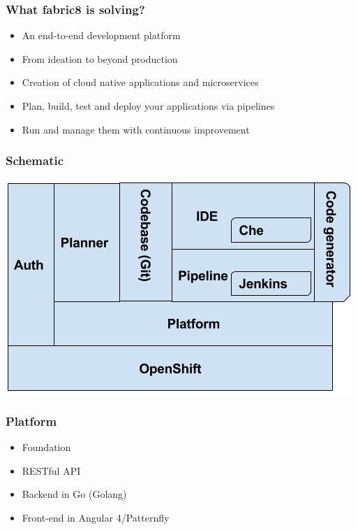 \documentclass[aspectratio=169]{beamer}
\begin{document}
\begin{frame}
  \frametitle{What fabric8 is solving?}

  \begin{itemize}

  \item<1-> An end-to-end development platform

  \item<2-> From ideation to beyond production

  \item<3-> Creation of cloud native applications and  microservices

  \item<4-> Plan, build, test and deploy your applications via pipelines

  \item<5-> Run and manage them with continuous improvement

  \end{itemize}

\end{frame}

\begin{frame}
  \frametitle{Schematic}
  \includegraphics[scale=.65]{images/schematic.png}
\end{frame}

\begin{frame}
  \frametitle{Platform}

  \begin{itemize}
  \item<1-> Foundation
  \item<2-> RESTful API
  \item<3-> Backend in Go (Golang)
  \item<4-> Front-end in Angular 4/Patternfly
  \end{itemize}

\end{frame}
\end{document}
